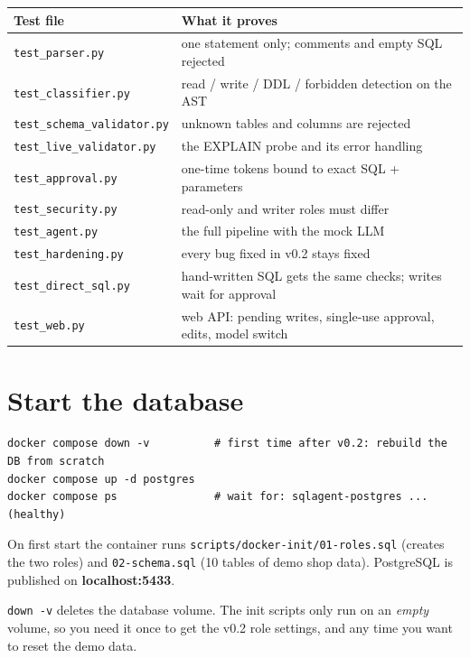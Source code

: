 \documentclass[11pt,a4paper]{article}
\newcommand{\note}[1]{%
  \par\smallskip\noindent\colorbox{warnbg}{\parbox{\dimexpr\linewidth-2\fboxsep}{\small #1}}\par\smallskip}
\begin{document}
\begin{center}
\begin{tabular}{@{}ll@{}}
\toprule
\textbf{Test file} & \textbf{What it proves} \\
\midrule
\texttt{test\_parser.py}           & one statement only; comments and empty SQL rejected \\
\texttt{test\_classifier.py}       & read / write / DDL / forbidden detection on the AST \\
\texttt{test\_schema\_validator.py}& unknown tables and columns are rejected \\
\texttt{test\_live\_validator.py}  & the EXPLAIN probe and its error handling \\
\texttt{test\_approval.py}         & one-time tokens bound to exact SQL + parameters \\
\texttt{test\_security.py}         & read-only and writer roles must differ \\
\texttt{test\_agent.py}            & the full pipeline with the mock LLM \\
\texttt{test\_hardening.py}        & every bug fixed in v0.2 stays fixed \\
\texttt{test\_direct\_sql.py}      & hand-written SQL gets the same checks; writes wait for approval \\
\texttt{test\_web.py}              & web API: pending writes, single-use approval, edits, model switch \\
\bottomrule
\end{tabular}
\end{center}

\section{Start the database}

\begin{lstlisting}
docker compose down -v          # first time after v0.2: rebuild the DB from scratch
docker compose up -d postgres
docker compose ps               # wait for: sqlagent-postgres ... (healthy)
\end{lstlisting}

On first start the container runs \texttt{scripts/docker-init/01-roles.sql}
(creates the two roles) and \texttt{02-schema.sql} (10 tables of demo shop
data). PostgreSQL is published on \textbf{localhost:5433}.

\note{\texttt{down -v} deletes the database volume. The init scripts only run
on an \emph{empty} volume, so you need it once to get the v0.2 role settings,
and any time you want to reset the demo data.}
\end{document}
